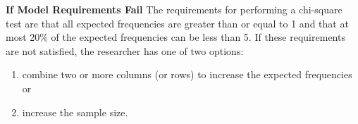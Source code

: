 \documentclass{report}
\begin{document}
        \bigbreak \noindent \bigbreak \noindent 
        \textbf{ If Model Requirements Fail}
        \bigbreak \noindent 
        The requirements for performing a chi-square test are that all expected frequencies are greater than or equal to 1 and that at most 20\% of the expected frequencies can be less than 5.
        \bigbreak \noindent 
        If these requirements are not satisfied, the researcher has one of two options:
        \begin{enumerate}
            \item combine two or more columns (or rows) to increase the expected frequencies or
            \item increase the sample size.
        \end{enumerate}


























      










    
\end{document}

